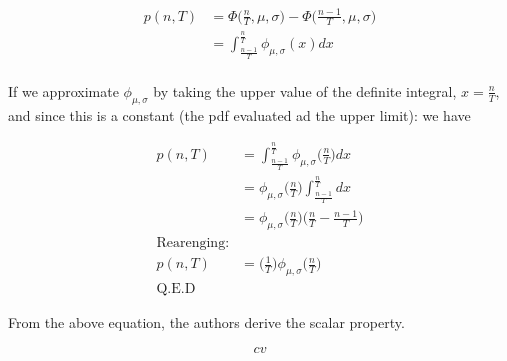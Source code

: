 \documentclass[11pt]{article}
\begin{document}
    \begin{align*}
        p(n,T) &= \Phi \Big ( \frac{n}{T}, \mu, \sigma \Big) - \Phi \Big ( \frac{n - 1}{T},\mu,\sigma \Big)\\
               &= \int_{\frac{n-1}{T}}^{\frac{n}{T}} \phi_{\mu,\sigma}(x)dx\\
    \end{align*}

    If we approximate $\phi_{\mu,\sigma}$ by taking the upper value of the definite integral, $x = \frac{n}{T}$, and
    since this is a constant (the pdf evaluated ad the upper limit): we have

    \begin{align*}
        p(n,T) &= \int_{\frac{n-1}{T}}^{\frac{n}{T}} \phi_{\mu,\sigma} \Big( \frac{n}{T} \Big)dx\\
               &= \phi_{\mu,\sigma} \Big (\frac{n}{T} \Big)\int_{\frac{n-1}{T}}^{\frac{n}{T}}dx \\
               &= \phi_{\mu,\sigma} \Big (\frac{n}{T} \Big) \Big (\frac{n}{T} - \frac{n-1}{T} \Big) \\
        \text{Rearenging:} \\
        p(n,T)  &= \Big (\frac{1}{T} \Big) \phi_{\mu,\sigma}  \Big (\frac{n}{T} \Big) \\
        \text{Q.E.D}
    \end{align*}

    From the above equation, the authors derive the scalar property.

    \[
        cv
    \]
\end{document}
